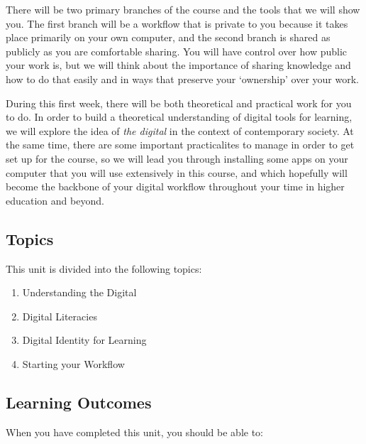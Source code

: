 \documentclass[
]{book}
\providecommand{\tightlist}{%
  \setlength{\itemsep}{0pt}\setlength{\parskip}{0pt}}
\theoremstyle{definition}
\theoremstyle{definition}
\theoremstyle{definition}
\theoremstyle{definition}
\theoremstyle{remark}
\begin{document}
There will be two primary branches of the course and the tools that we will show you. The first branch will be a workflow that is private to you because it takes place primarily on your own computer, and the second branch is shared as publicly as you are comfortable sharing. You will have control over how public your work is, but we will think about the importance of sharing knowledge and how to do that easily and in ways that preserve your `ownership' over your work.

During this first week, there will be both theoretical and practical work for you to do. In order to build a theoretical understanding of digital tools for learning, we will explore the idea of \emph{the digital} in the context of contemporary society. At the same time, there are some important practicalites to manage in order to get set up for the course, so we will lead you through installing some apps on your computer that you will use extensively in this course, and which hopefully will become the backbone of your digital workflow throughout your time in higher education and beyond.

\hypertarget{topics}{%
\subsection*{Topics}\label{topics}}

This unit is divided into the following topics:

\begin{enumerate}
\def\labelenumi{\arabic{enumi}.}
\setcounter{enumi}{1}
\tightlist
\item
  Understanding the Digital
\item
  Digital Literacies
\item
  Digital Identity for Learning
\item
  Starting your Workflow
\end{enumerate}

\hypertarget{learning-outcomes}{%
\subsection*{Learning Outcomes}\label{learning-outcomes}}

When you have completed this unit, you should be able to:
\end{document}
